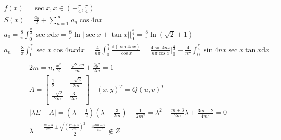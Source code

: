 \documentclass{article}
\begin{document}
\begin{align*}
    f(x) = \sec x , x \in (-\frac{\pi}{4},\frac{\pi}{4}) \\
    S(x) = \frac{a_{0}}{2} + \sum_{n=1}^{\infty}a_{n}\cos 4nx \\
    a_{0} = \frac{8}{\pi}\int_{0}^{\frac{\pi}{4}} \sec x \mathrm{d}x = \frac{8}{\pi}\ln|\sec x + \tan x| |_{0}^{\frac{\pi}{4}} = \frac{8}{\pi}\ln(\sqrt{2}+1) \\ 
    a_{n} = \frac{8}{\pi}\int_{0}^{\frac{\pi}{4}} \sec x \cos 4nx \mathrm{d}x = \frac{4}{n\pi}\int_{0}^{\frac{\pi}{4}} \frac{\mathrm{d}(\sin 4nx)}{\cos x} = \frac{4\sin 4nx}{n\pi\cos x} |_{0}^{\frac{\pi}{4}} - \frac{4}{n\pi}\int_{0}^{\frac{\pi}{4}}\sin 4nx \sec x \tan x \mathrm{d}x  = \\
   \end{align*}
\begin{align*}
    2m = n , \frac{x^2}{2}-\frac{\sqrt{2}xy}{m}+\frac{3y^2}{2m} = 1 \\
    A = \left[
        \begin{array}{cc}
            \frac{1}{2} & \frac{-\sqrt{2}}{2m} \\
            \frac{-\sqrt{2}}{2m} & \frac{3}{2m} \\  
        \end{array}
    \right] \quad \left(x,y\right)^{T} = Q \left(u,v\right)^{T} \\ 
    |\lambda E - A| = (\lambda-\frac{1}{2})(\lambda-\frac{3}{2m})-\frac{1}{2m^2} = \lambda^2-\frac{m+3}{2m}\lambda+\frac{3m-2}{4m^2} = 0 \\
    \lambda = \frac{\frac{m+3}{2m} \pm \sqrt{\left(\frac{m+3}{2m}\right)^2-4\frac{3m-2}{4m^2}}}{2} \notin Z \\ 
\end{align*}
\clearpage
\end{document}
